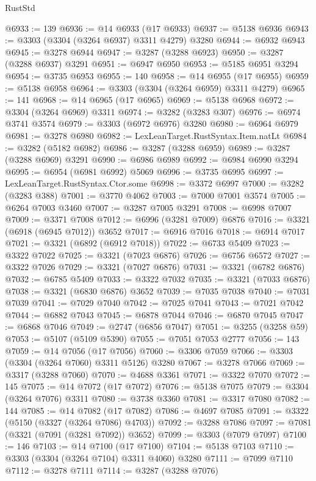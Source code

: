 \begin{lexlean}{RustStd}
\begin{coremodule}
{\begin{coremodule}
{{{{{{{{{{{{{{{{{{{{{{{{{{{{{{{{{@6933 := 139
@6936 := @14 @6933 (@17 @6933)
@6937 := @5138 @6936
@6943 := @3303 (@3304 (@3264 @6937) @3311 @4279) @3280
@6944 := @6932 @6943
@6945 := @3278 @6944
@6947 := @3287 (@3288 @6923)
@6950 := @3287 (@3288 @6937) @3291
@6951 := @6947 @6950
@6953 := @5185 @6951 @3294
@6954 := @3735 @6953
@6955 := 140
@6958 := @14 @6955 (@17 @6955)
@6959 := @5138 @6958
@6964 := @3303 (@3304 (@3264 @6959) @3311 @4279)
@6965 := 141
@6968 := @14 @6965 (@17 @6965)
@6969 := @5138 @6968
@6972 := @3304 (@3264 @6969) @3311
@6974 := @3282 (@3283 @307)
@6976 := @6974 @3741 @3574
@6979 := @3303 (@6972 @6976) @3280
@6980 := @6964 @6979
@6981 := @3278 @6980
@6982 := LexLeanTarget.RustSyntax.Item.natLt
@6984 := @3282 (@5182 @6982)
@6986 := @3287 (@3288 @6959)
@6989 := @3287 (@3288 @6969) @3291
@6990 := @6986 @6989
@6992 := @6984 @6990 @3294
@6995 := @6954 (@6981 @6992) @5069
@6996 := @3735 @6995
@6997 := LexLeanTarget.RustSyntax.Ctor.some
@6998 := @3372 @6997
@7000 := @3282 (@3283 @388)
@7001 := @3770 @4062
@7003 := @7000 @7001 @3574
@7005 := @6264 @7003 @3460
@7007 := @3287 @7005 @3291
@7008 := @6998 @7007
@7009 := @3371 @7008
@7012 := @6996 (@3281 @7009) @6876
@7016 := @3321 (@6918 (@6945 @7012)) @3652
@7017 := @6916 @7016
@7018 := @6914 @7017
@7021 := @3321 (@6892 (@6912 @7018))
@7022 := @6733 @5409
@7023 := @3322 @7022
@7025 := @3321 (@7023 @6876)
@7026 := @6756 @6572
@7027 := @3322 @7026
@7029 := @3321 (@7027 @6876)
@7031 := @3321 (@6782 @6876)
@7032 := @6785 @5409
@7033 := @3322 @7032
@7035 := @3321 (@7033 @6876)
@7038 := @3321 (@6830 @6876) @3652
@7039 := @7035 @7038
@7040 := @7031 @7039
@7041 := @7029 @7040
@7042 := @7025 @7041
@7043 := @7021 @7042
@7044 := @6882 @7043
@7045 := @6878 @7044
@7046 := @6870 @7045
@7047 := @6868 @7046
@7049 := @2747 (@6856 @7047)
@7051 := @3255 (@3258 @59)
@7053 := @5107 (@5109 @5390)
@7055 := @7051 @7053 @2777
@7056 := 143
@7059 := @14 @7056 (@17 @7056)
@7060 := @3306 @7059
@7066 := @3303 (@3304 (@3264 @7060) @3311 @5126) @3280
@7067 := @3278 @7066
@7069 := @3317 (@3288 @7060)
@7070 := @4688 @3361
@7071 := @3322 @7070
@7072 := 145
@7075 := @14 @7072 (@17 @7072)
@7076 := @5138 @7075
@7079 := @3304 (@3264 @7076) @3311
@7080 := @3738 @3360
@7081 := @3317 @7080
@7082 := 144
@7085 := @14 @7082 (@17 @7082)
@7086 := @4697 @7085
@7091 := @3322 (@5150 (@3327 (@3264 @7086) @4703))
@7092 := @3288 @7086
@7097 := @7081 (@3321 (@7091 (@3281 @7092)) @3652)
@7099 := @3303 (@7079 @7097)
@7100 := 146
@7103 := @14 @7100 (@17 @7100)
@7104 := @5138 @7103
@7110 := @3303 (@3304 (@3264 @7104) @3311 @4060) @3280
@7111 := @7099 @7110
@7112 := @3278 @7111
@7114 := @3287 (@3288 @7076)
}}}}}}}}}}}}}}}}}}}}}}}}}}}}}}}}}
\end{coremodule}}
\end{coremodule}
\end{lexlean}
